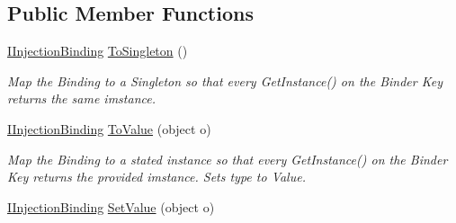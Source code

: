 \subsection*{Public Member Functions}
\begin{DoxyCompactItemize}
\item 
\hypertarget{interfacestrange_1_1extensions_1_1injector_1_1api_1_1_i_injection_binding_ae88e872043b9c0c8e6932d6457f8c5e7}{\hyperlink{interfacestrange_1_1extensions_1_1injector_1_1api_1_1_i_injection_binding}{I\-Injection\-Binding} \hyperlink{interfacestrange_1_1extensions_1_1injector_1_1api_1_1_i_injection_binding_ae88e872043b9c0c8e6932d6457f8c5e7}{To\-Singleton} ()}\label{interfacestrange_1_1extensions_1_1injector_1_1api_1_1_i_injection_binding_ae88e872043b9c0c8e6932d6457f8c5e7}

\begin{DoxyCompactList}\small\item\em Map the Binding to a Singleton so that every {\ttfamily Get\-Instance()} on the Binder Key returns the same imstance. \end{DoxyCompactList}\item 
\hypertarget{interfacestrange_1_1extensions_1_1injector_1_1api_1_1_i_injection_binding_a7e7eee027ed73a36c38f18b865bbe4c6}{\hyperlink{interfacestrange_1_1extensions_1_1injector_1_1api_1_1_i_injection_binding}{I\-Injection\-Binding} \hyperlink{interfacestrange_1_1extensions_1_1injector_1_1api_1_1_i_injection_binding_a7e7eee027ed73a36c38f18b865bbe4c6}{To\-Value} (object o)}\label{interfacestrange_1_1extensions_1_1injector_1_1api_1_1_i_injection_binding_a7e7eee027ed73a36c38f18b865bbe4c6}

\begin{DoxyCompactList}\small\item\em Map the Binding to a stated instance so that every {\ttfamily Get\-Instance()} on the Binder Key returns the provided imstance. Sets type to Value. \end{DoxyCompactList}\item 
\hypertarget{interfacestrange_1_1extensions_1_1injector_1_1api_1_1_i_injection_binding_aaf4603dc2e97ccc6dbfefbf20cc77de4}{\hyperlink{interfacestrange_1_1extensions_1_1injector_1_1api_1_1_i_injection_binding}{I\-Injection\-Binding} \hyperlink{interfacestrange_1_1extensions_1_1injector_1_1api_1_1_i_injection_binding_aaf4603dc2e97ccc6dbfefbf20cc77de4}{Set\-Value} (object o)}\label{interfacestrange_1_1extensions_1_1injector_1_1api_1_1_i_injection_binding_aaf4603dc2e97ccc6dbfefbf20cc77de4}


\end{DoxyCompactItemize}

